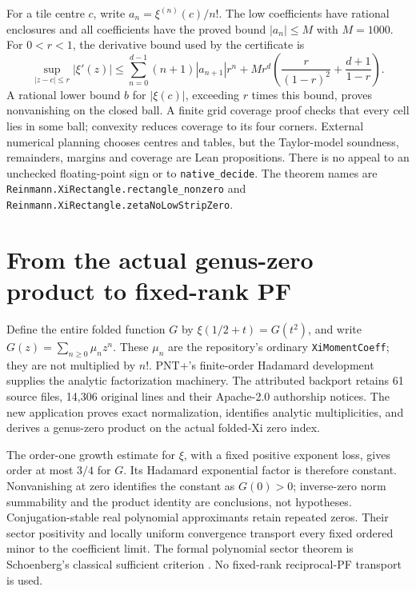 \documentclass[11pt]{amsart}
\begin{document}
For a tile centre $c$, write $a_n=\xi^{(n)}(c)/n!$. The low coefficients have
rational enclosures and all coefficients have the proved bound $|a_n|\le M$
with $M=1000$. For $0<r<1$, the derivative bound used by the certificate is
\[
 \sup_{|z-c|\le r}|\xi'(z)|\le
 \sum_{n=0}^{d-1}(n+1)|a_{n+1}|r^n+
 M r^d\left(\frac{r}{(1-r)^2}+\frac{d+1}{1-r}\right).
\]
A rational lower bound $b$ for $|\xi(c)|$, exceeding $r$ times this bound,
proves nonvanishing on the closed ball. A finite grid coverage proof checks
that every cell lies in some ball; convexity reduces coverage to its four
corners. External numerical planning chooses centres and tables, but the
Taylor-model soundness, remainders, margins and coverage are Lean propositions.
There is no appeal to an unchecked floating-point sign or to
\texttt{native\_decide}. The theorem names are
\texttt{Reinmann.XiRectangle.rectangle\_nonzero} and
\texttt{Reinmann.XiRectangle.zetaNoLowStripZero}.

\section{From the actual genus-zero product to fixed-rank PF}
Define the entire folded function $G$ by $\xi(1/2+t)=G(t^2)$, and write
$G(z)=\sum_{n\ge0}\mu_n z^n$. These $\mu_n$ are the repository's ordinary
\texttt{XiMomentCoeff}; they are not multiplied by $n!$.
PNT+'s finite-order Hadamard development \cite{pntplus} supplies the analytic
factorization machinery. The attributed backport retains 61 source files,
14,306 original lines and their Apache-2.0 authorship notices. The new
application proves exact normalization, identifies analytic multiplicities,
and derives a genus-zero product on the actual folded-Xi zero index.

The order-one growth estimate for $\xi$, with a fixed positive exponent loss,
gives order at most $3/4$ for $G$. Its Hadamard exponential factor is therefore
constant. Nonvanishing at zero identifies the constant as $G(0)>0$; inverse-zero
norm summability and the product identity are conclusions, not hypotheses.
Conjugation-stable real polynomial approximants retain repeated zeros. Their
sector positivity and locally uniform convergence transport every fixed
ordered minor to the coefficient limit. The formal polynomial sector theorem
is Schoenberg's classical sufficient criterion \cite{schoenberg,katkova}.
No fixed-rank reciprocal-PF transport is used.
\end{document}
